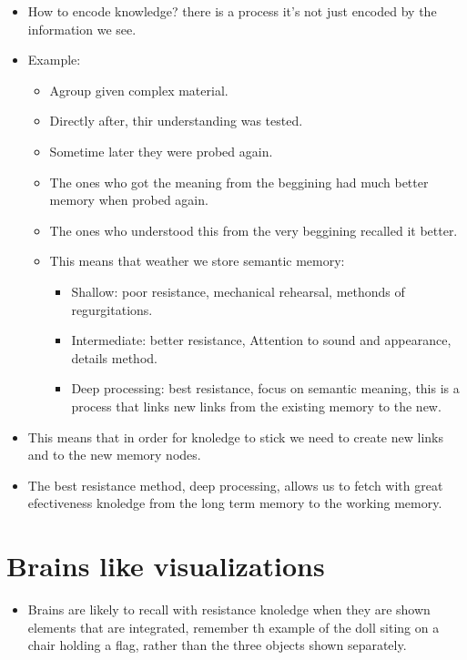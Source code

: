 \begin{itemize}
    \item How to encode knowledge? there is a process it's not just encoded by the information we see.
    \item Example: 
        \begin{itemize}
            \item Agroup given complex material.
            \item Directly after, thir understanding was tested. 
            \item Sometime later they were probed again.
            \item The ones who got the meaning from the beggining had much better memory when probed again.
            \item The ones who understood this from the very beggining recalled it better.
        \end{itemize}
        \begin{itemize}[label=\#]
            \item This means that weather we store semantic memory:
                \begin{itemize}
                    \item Shallow: poor resistance, mechanical rehearsal, methonds of regurgitations.
                    \item Intermediate: better resistance, Attention to sound and appearance, details method.
                    \item Deep processing: best resistance, focus on semantic meaning, this is a process that links new links from the existing memory to the new.
                \end{itemize}
        \end{itemize}
    
    \item This means that in order for knoledge to stick we need to create new links and to the new memory nodes.  
    \item The best resistance method, deep processing, allows us to fetch with great efectiveness knoledge from the long term memory to the working memory.
\end{itemize}


\section{Brains like visualizations}
\begin{itemize}
    \item Brains are likely to recall with resistance knoledge when they are shown elements that are integrated, remember th example of the doll siting on a chair holding a flag, rather than the three objects shown separately.
\end{itemize}


